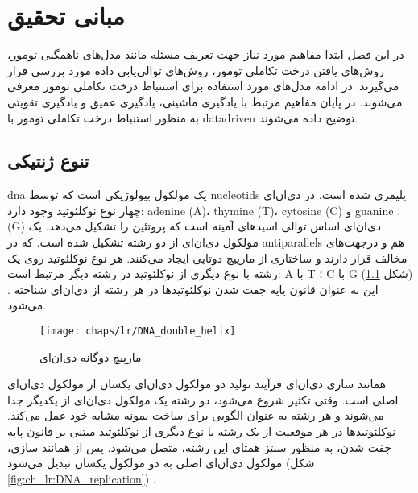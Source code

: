 
\chapter{مبانی تحقیق}

در این فصل ابتدا مفاهیم مورد نیاز جهت تعریف مسئله مانند مدل‌های ناهمگنی تومور، روش‌های یافتن درخت تکاملی تومور، روش‌های توالی‌یابی داده مورد بررسی قرار می‌گیرند. در ادامه مدل‌های مورد استفاده برای استنباط درخت تکاملی تومور معرفی می‌شوند. در پایان مفاهیم مرتبط با یادگیری ماشینی، یادگیری عمیق و یادگیری تقویتی به منظور استنباط درخت تکاملی تومور با \gls{datadriven}  توضیح داده می‌شوند.


\section{تنوع ژنتیکی}

\gls{dna}  یک مولکول بیولوژیکی است که توسط \glspl{nucleotid}  پلیمری شده است. در دی‌ان‌ای چهار نوع نوکلئوتید وجود دارد: \gls{adenine}  (A)، \gls{thymine}  (T)، \gls{cytosine}  (C) و \gls{guanine}  .(G) دی‌ان‌ای اساس توالی اسیدهای آمینه است که پروتئین را تشکیل می‌دهد. یک مولکول دی‌ان‌ای از دو رشته تشکیل شده است. که در \glspl{antiparallel}  هم و درجهت‌های مخالف قرار دارند و ساختاری از مارپیچ دوتایی ایجاد می‌کنند. هر نوع نوکلئوتید روی یک رشته با نوع دیگری از نوکلئوتید در رشته دیگر مرتبط است: A با T ؛ C با G (شکل \ref{fig:ch_lr:DNA_double_helix}) \cite{alberts2002molecular}. این به عنوان قانون پایه جفت شدن نوکلئوتید‌ها در هر رشته از دی‌ان‌ای شناخته می‌شود.


\begin{figure}[!ht]
	\centerline{\texttt{[image: chaps/lr/DNA\_double\_helix]}}
	\caption{مارپیچ دوگانه دی‌ان‌ای}
	\label{fig:ch_lr:DNA_double_helix}
\end{figure}



همانند سازی دی‌ان‌ای فرآیند تولید دو مولکول دی‌ان‌ای یکسان از مولکول دی‌ان‌ای اصلی است. وقتی تکثیر شروع می‌شود، دو رشته یک مولکول دی‌ان‌ای از یکدیگر جدا می‌شوند و هر رشته به عنوان الگویی برای ساخت نمونه مشابه خود عمل می‌کند. نوکلئوتید‌ها در هر موقعیت از یک رشته با نوع دیگری از نوکلئوتید مبتنی بر قانون پایه جفت شدن، به منظور سنتز همتای این رشته، متصل می‌شود. پس از همانند سازی، مولکول دی‌ان‌ای اصلی به دو مولکول یکسان تبدیل می‌شود (شکل \ref{fig:ch_lr:DNA_replication}) \cite{alberts2002molecular}.

